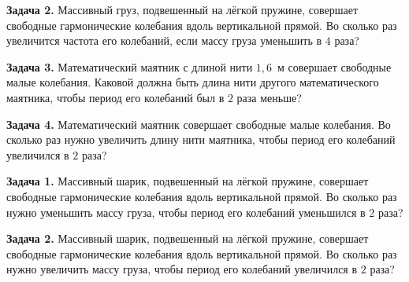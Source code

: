\begin{taskbasic}[code={\label{task:oscillations_v14_n4}}]
\textbf{Задача 2.} Массивный груз, подвешенный на лёгкой пружине, совершает свободные гармонические колебания вдоль вертикальной прямой. Во сколько раз увеличится частота его колебаний, если массу груза уменьшить в $4$ раза?

\end{taskbasic}

\begin{taskbasic}[code={\label{task:oscillations_v19_n4}}]
\textbf{Задача 3.} Математический маятник с длиной нити $1{,}6$~м совершает свободные малые колебания. Каковой должна быть длина нити другого математического маятника, чтобы период его колебаний был в $2$ раза меньше?

\end{taskbasic}

\begin{taskbasic}[code={\label{task:oscillations_v20_n4}}]
\textbf{Задача 4.} Математический маятник совершает свободные малые колебания. Во сколько раз нужно увеличить длину нити маятника, чтобы период его колебаний увеличился в $2$ раза?

\end{taskbasic}


\begin{taskbasic}[code={\label{task:oscillations_v21_n4}}]
\textbf{Задача 1.} Массивный шарик, подвешенный на лёгкой пружине, совершает свободные гармонические колебания вдоль вертикальной прямой. Во сколько раз нужно уменьшить массу груза, чтобы период его колебаний уменьшился в $2$ раза?

\end{taskbasic}

\begin{taskbasic}[code={\label{task:oscillations_v22_n4}}]
\textbf{Задача 2.} Массивный шарик, подвешенный на лёгкой пружине, совершает свободные гармонические колебания вдоль вертикальной прямой. Во сколько раз нужно увеличить массу груза, чтобы период его колебаний увеличился в $2$ раза?

\end{taskbasic}

